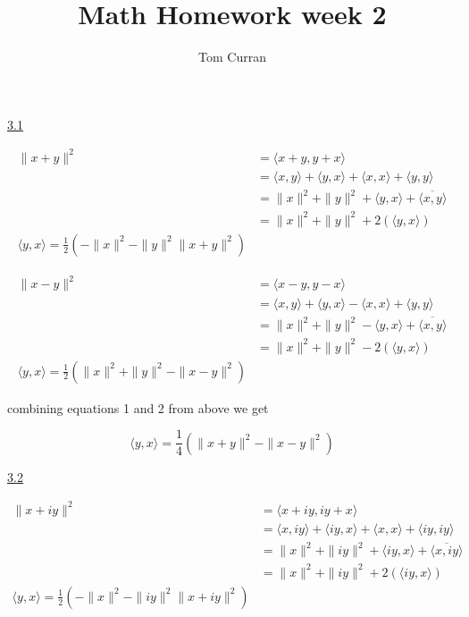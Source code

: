 \documentclass{article}
\title{Math Homework week 2}
\author{Tom Curran}
\begin{document}
\maketitle{}
\section{}

\underline{3.1}

\begin{equation} \label{eq1}
  \begin{split}
  \| x+ y \|^2 & = \langle x+ y, y+x\rangle \\
  & = \langle x,y \rangle + \langle y,x\rangle + \langle x,x\rangle + \langle y,y \rangle \\
  & = \| x\|^2 + \| y \|^2 + \langle y,x\rangle + \overline{\langle x,y \rangle} \\
  & = \| x\|^2 + \| y \|^2 + 2( \langle y,x\rangle )\\
  \langle y,x\rangle = \frac{1}{2}( - \| x\|^2 - \| y \|^2  \| x + y \|^2)
 \end{split}
\end{equation}\label{eq1}

\begin{equation} \label{eq2}
  \begin{split}
  \| x - y \|^2 & = \langle x - y, y - x\rangle \\
  & = \langle x,y \rangle + \langle y,x\rangle - \langle x,x\rangle + \langle y,y \rangle \\
  & = \| x\|^2 + \| y \|^2 -\langle y,x\rangle + \overline{\langle x,y \rangle} \\
  & = \| x\|^2 + \| y \|^2 - 2( \langle y,x\rangle ) \\
  \langle y,x\rangle = \frac{1}{2}(\| x\|^2 + \| y \|^2 - \| x-y \|^2)
 \end{split}
\end{equation}\label{eq2}

combining equations 1 and 2 from above we get

\[ \langle y,x\rangle =  \frac{1}{4} (\| x+ y \|^2 - \| x - y \|^2) \]

\underline{3.2}

\begin{equation} \label{eq3}
  \begin{split}
  \| x + i y \|^2 & = \langle x+ iy, iy+x\rangle \\
  & = \langle x,iy \rangle + \langle iy,x\rangle + \langle x,x\rangle + \langle iy,iy \rangle \\
  & = \| x\|^2 + \| iy \|^2 + \langle iy,x\rangle + \overline{\langle x,iy \rangle} \\
  & = \| x\|^2 + \| iy \|^2 + 2( \langle iy,x\rangle )\\
  \langle y,x\rangle = \frac{1}{2}( - \| x\|^2 - \| iy \|^2  \| x + i y \|^2)
 \end{split}
\end{equation}\label{eq3}
\end{document}
